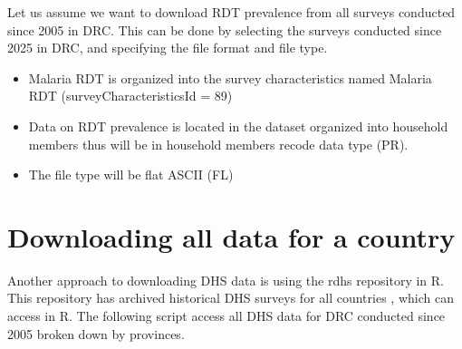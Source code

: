 \documentclass[
  letterpaper,
  DIV=11,
  numbers=noendperiod]{scrreprt}
\newenvironment{Shaded}{\begin{snugshade}}{\end{snugshade}}
\newcommand{\AttributeTok}[1]{\textcolor[rgb]{0.40,0.45,0.13}{#1}}
\newcommand{\CommentTok}[1]{\textcolor[rgb]{0.37,0.37,0.37}{#1}}
\newcommand{\DecValTok}[1]{\textcolor[rgb]{0.68,0.00,0.00}{#1}}
\newcommand{\FunctionTok}[1]{\textcolor[rgb]{0.28,0.35,0.67}{#1}}
\newcommand{\NormalTok}[1]{\textcolor[rgb]{0.00,0.23,0.31}{#1}}
\newcommand{\OtherTok}[1]{\textcolor[rgb]{0.00,0.23,0.31}{#1}}
\newcommand{\StringTok}[1]{\textcolor[rgb]{0.13,0.47,0.30}{#1}}
\begin{document}
Let us assume we want to download RDT prevalence from all surveys
conducted since 2005 in DRC. This can be done by selecting the surveys
conducted since 2025 in DRC, and specifying the file format and file
type.

\begin{itemize}
\item
  Malaria RDT is organized into the survey characteristics named Malaria
  RDT (surveyCharacteristicsId = 89)
\item
  Data on RDT prevalence is located in the dataset organized into
  household members thus will be in household members recode data type
  (PR).
\item
  The file type will be flat ASCII (FL)
\end{itemize}

\begin{Shaded}
\end{Shaded}

\section{Downloading all data for a
country}\label{downloading-all-data-for-a-country}

Another approach to downloading DHS data is using the rdhs repository in
R. This repository has archived historical DHS surveys for all countries
, which can access in R. The following script access all DHS data for
DRC conducted since 2005 broken down by provinces.
\end{document}
